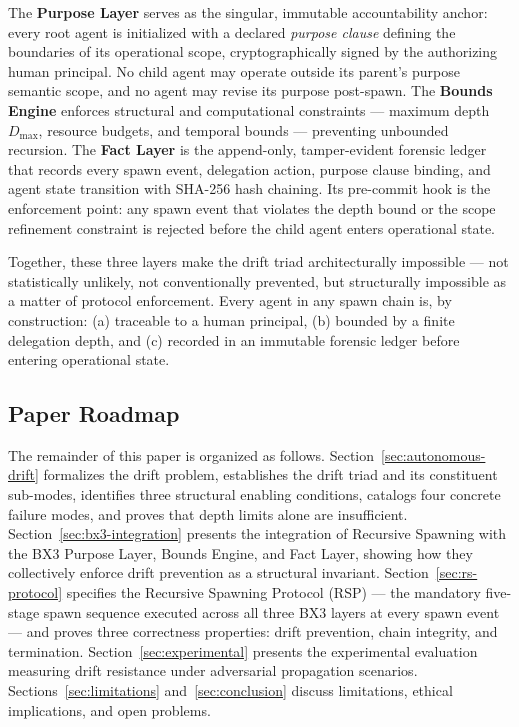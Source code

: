 The \textbf{Purpose Layer} serves as the singular, immutable accountability anchor: every root agent is initialized with a declared \textit{purpose clause} defining the boundaries of its operational scope, cryptographically signed by the authorizing human principal. No child agent may operate outside its parent's purpose semantic scope, and no agent may revise its purpose post-spawn. The \textbf{Bounds Engine} enforces structural and computational constraints — maximum depth $D_{\max}$, resource budgets, and temporal bounds — preventing unbounded recursion. The \textbf{Fact Layer} is the append-only, tamper-evident forensic ledger that records every spawn event, delegation action, purpose clause binding, and agent state transition with SHA-256 hash chaining. Its pre-commit hook is the enforcement point: any spawn event that violates the depth bound or the scope refinement constraint is rejected before the child agent enters operational state.

Together, these three layers make the drift triad architecturally impossible — not statistically unlikely, not conventionally prevented, but structurally impossible as a matter of protocol enforcement. Every agent in any spawn chain is, by construction: (a) traceable to a human principal, (b) bounded by a finite delegation depth, and (c) recorded in an immutable forensic ledger before entering operational state.

\subsection{Paper Roadmap}
\label{sec:intro-roadmap}

The remainder of this paper is organized as follows. Section~\ref{sec:autonomous-drift} formalizes the drift problem, establishes the drift triad and its constituent sub-modes, identifies three structural enabling conditions, catalogs four concrete failure modes, and proves that depth limits alone are insufficient. Section~\ref{sec:bx3-integration} presents the integration of Recursive Spawning with the BX3 Purpose Layer, Bounds Engine, and Fact Layer, showing how they collectively enforce drift prevention as a structural invariant. Section~\ref{sec:rs-protocol} specifies the Recursive Spawning Protocol (RSP) — the mandatory five-stage spawn sequence executed across all three BX3 layers at every spawn event — and proves three correctness properties: drift prevention, chain integrity, and termination. Section~\ref{sec:experimental} presents the experimental evaluation measuring drift resistance under adversarial propagation scenarios. Sections~\ref{sec:limitations} and~\ref{sec:conclusion} discuss limitations, ethical implications, and open problems.
